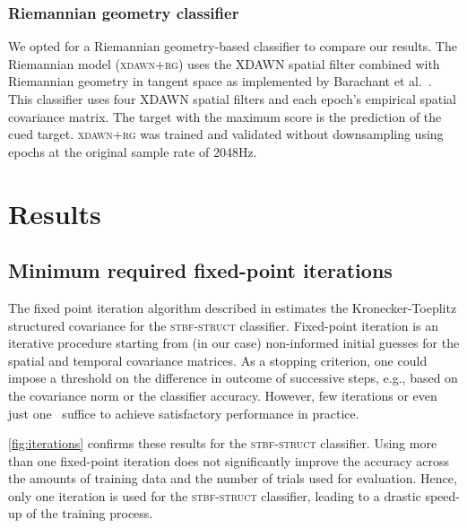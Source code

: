 	\subsubsection{Riemannian geometry classifier}
	\label{sec:riemannian}
	We opted for a Riemannian
	geometry-based classifier to compare our results.
	The Riemannian model (\textsc{xdawn+rg}) uses the XDAWN spatial filter combined
	with Riemannian geometry in tangent space as implemented by Barachant et
	al.~\cite{Barachant2014a}.
	This classifier uses four XDAWN spatial filters and each epoch's empirical spatial covariance matrix.
	The target with the maximum score is the prediction of the cued target.
	\textsc{xdawn+rg} was trained and validated without downsampling using epochs
	at the original sample rate of 2048Hz.

	\section{Results}
	\subsection{Minimum required fixed-point iterations}
	The fixed point iteration algorithm described
	in
  estimates the Kronecker-Toeplitz structured covariance for the
	\textsc{stbf-struct} classifier.
	Fixed-point iteration is an iterative procedure starting from (in our case)
	non-informed initial guesses for the spatial and temporal covariance matrices.
	As a stopping criterion, one could impose a threshold on the difference in
	outcome of successive steps, e.g., based on the covariance norm or the
	classifier accuracy.
	However, few iterations or even just one~\cite{Castaneda2014} suffice to achieve satisfactory performance in practice.

	\cref{fig:iterations} confirms these results for the \textsc{stbf-struct} classifier.
	Using more than one fixed-point iteration does not significantly improve the
	accuracy across the amounts of training data and the number of trials
	used for evaluation.
	Hence, only one iteration is used for the \textsc{stbf-struct} classifier, leading to a drastic speed-up of
	the training process.


